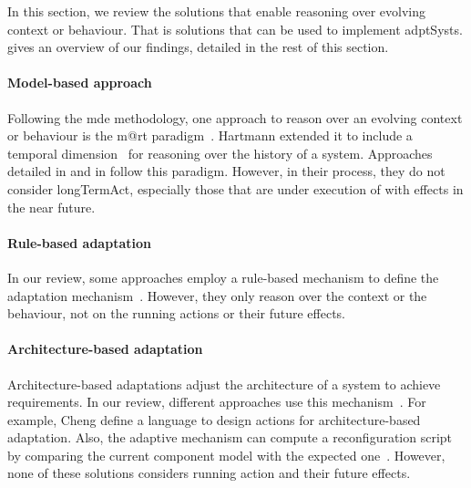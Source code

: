 In this section, we review the solutions that enable reasoning over evolving context or \gls{behaviour}.
That is solutions that can be used to implement \glspl{adptSyst}.
 gives an overview of our findings, detailed in the rest of this section.

\paragraph{Model-based approach}
Following the \gls{mde} methodology, one approach to reason over an evolving context or \gls{behaviour} is the \gls{m@rt} paradigm~\cite{DBLP:journals/computer/BlairBF09, DBLP:journals/computer/MorinBJFS09}.
Hartmann \etal extended it to include a temporal dimension~\cite{DBLP:conf/seke/0001FNMKT14, DBLP:conf/models/0001FNMKBT14} for reasoning over the history of a system.
Approaches detailed in \cite{DBLP:conf/icse/BarbosaLMJ17} and in \cite{DBLP:conf/icse/ChenPYNZ14} follow this paradigm.
However, in their process, they do not consider \gls{longTermAct}, especially those that are under execution of with effects in the near future.

\paragraph{Rule-based adaptation}
In our review, some approaches employ a rule-based mechanism to define the adaptation mechanism~\cite{DBLP:conf/icse/ArcainiRS15, DBLP:conf/icse/TaharaOH17, DBLP:conf/eurosys/GraceHPBCT08}.
However, they only reason over the context or the behaviour, not on the running actions or their future effects.

\paragraph{Architecture-based adaptation}
Architecture-based adaptations adjust the architecture of a system to achieve requirements.
In our review, different approaches use this mechanism~\cite{DBLP:journals/jss/ChengG12, DBLP:journals/computer/GarlanCHSS04, DBLP:journals/computer/GeorgasHT09, DBLP:conf/cbse/FouquetMFBPJ12}.
For example, Cheng \etal define a language to design \glspl{action} for architecture-based adaptation.
Also, the adaptive mechanism can compute a reconfiguration script by comparing the current component model with the expected one~\cite{DBLP:conf/cbse/FouquetMFBPJ12}.
However, none of these solutions considers running \gls{action} and their future effects.

